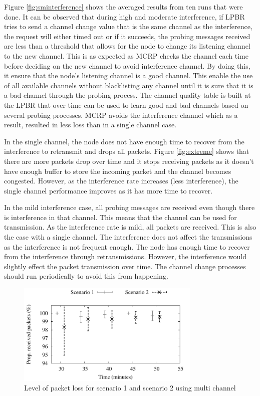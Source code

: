 Figure \ref{fig:sminterference} shows the averaged results from ten runs that were done. It can be observed that during high and moderate interference, if LPBR tries to send a channel change value that is the same channel as the interference, the request will either timed out or if it succeeds, the probing messages received are less than a threshold that allows for the node to change its listening channel to the new channel. This is as expected as MCRP checks the channel each time before deciding on the new channel to avoid interference channel. By doing this, it ensure that the node's listening channel is a good channel. This enable the use of all available channels without blacklisting any channel until it is sure that it is a bad channel through the probing process. The channel quality table is built at the LPBR that over time can be used to learn good and bad channels based on several probing processes. MCRP avoids the interference channel which as a result, resulted in less loss than in a single channel case. 

In the single channel, the node does not have enough time to recover from the interference to retransmit and drops all packets. Figure \ref{fig:extreme} shows that there are more packets drop over time and it stops receiving packets as it doesn't have enough buffer to store the incoming packet and the channel becomes congested. However, as the interference rate increases (less interference), the single channel performance improves as it has more time to recover.

In the mild interference case, all probing messages are received even though there is interference in that channel. This means that the channel can be used for transmission. As the interference rate is mild, all packets are received. This is also the case with a single channel. The interference does not affect the transmissions as the interference is not frequent enough. The node has enough time to recover from the interference through retransmissions. However, the interference would slightly effect the packet transmission over time. The channel change processes should run periodically to avoid this from happening.

\begin{figure}
\centering
\includegraphics[width=0.78\textwidth]{multi_channel.pdf}
\caption{Level of packet loss for scenario 1 and scenario 2 using multi channel}
\label{fig:multi_interference}
\end{figure}

